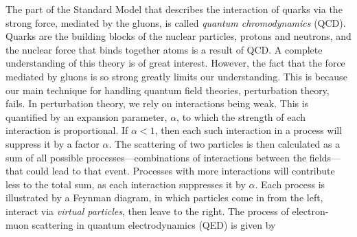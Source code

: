 The part of the Standard Model that describes the interaction of quarks via the strong force, mediated by the gluons, is called \emph{quantum chromodynamics} (QCD).
Quarks are the building blocks of the nuclear particles, protons and neutrons, and the nuclear force that binds together atoms is a result of QCD.
A complete understanding of this theory is of great interest.
However, the fact that the force mediated by gluons is so strong greatly limits our understanding.
This is because our main technique for handling quantum field theories, perturbation theory, fails.
In perturbation theory, we rely on interactions being weak.
This is quantified by an expansion parameter, $\alpha$, to which the strength of each interaction is proportional.
If $\alpha<1$, then each such interaction in a process will suppress it by a factor $\alpha$.
The scattering of two particles is then calculated as a sum of all possible processes---combinations of interactions between the fields---that could lead to that event.
Processes with more interactions will contribute less to the total sum, as each interaction suppresses it by $\alpha$.
Each process is illustrated by a Feynman diagram, in which particles come in from the left, interact via \emph{virtual particles}, then leave to the right.
The process of electron-muon scattering in quantum electrodynamics (QED) is given by
%
